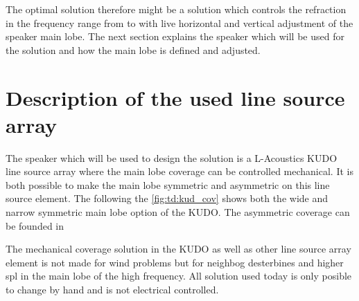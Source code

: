 
The optimal solution therefore might be a solution which controls the refraction in the frequency range from  to  with live horizontal and vertical adjustment of the speaker main lobe. The next section explains the speaker which will be used for the solution and how the main lobe is defined and adjusted.


\section{Description of the used line source array}\label{sec:prop:des_of_lin}

 The speaker which will be used to design the solution is a L-Acoustics KUDO line source array where the main lobe coverage can be controlled mechanical. It is both possible to make the main lobe symmetric and asymmetric on this line source element. The following the \autoref{fig:td:kud_cov} shows both the wide and narrow symmetric main lobe option of the KUDO. The asymmetric coverage can be founded in \citep{KUDO_data}


The mechanical coverage solution in the KUDO as well as other line source array element is not made for wind problems but for neighbog desterbines and higher \gls{spl} in the main lobe of the high frequency. All solution used today is only posible to change by hand and is not electrical controlled. 










